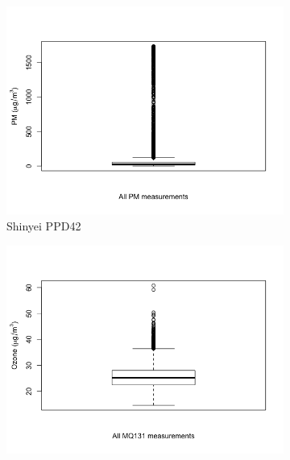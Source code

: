 \documentclass[11pt]{report}
\begin{document}

\begin{figure}[!tb]
    \centering
    \begin{minipage}{1\linewidth}
            \begin{subfigure}[t]{.5\linewidth}
                \includegraphics[width=\textwidth]{images/pm_boxplot}
                \caption{Shinyei PPD42}
                \label{fig:pm_boxplot}
            \end{subfigure}
            \begin{subfigure}[t]{.5\linewidth}
            	\includegraphics[width=\textwidth]{images/ozone_boxplot}

\end{subfigure}
\end{minipage}
\end{figure}
\end{document}
